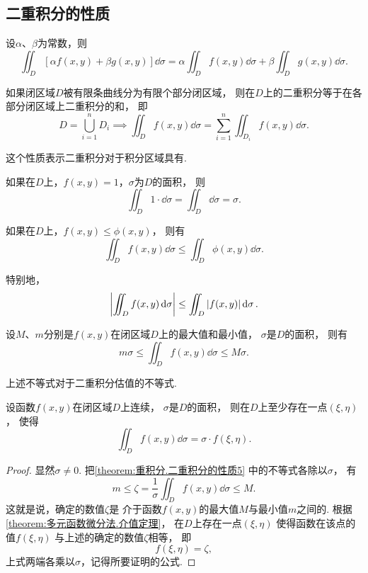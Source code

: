 \subsection{二重积分的性质}
\begin{property}\label{theorem:重积分.二重积分的性质1}
设\(\alpha\)、\(\beta\)为常数，则\[
\iint_D [\alpha f(x,y)+\beta g(x,y)] \dd{\sigma}
=\alpha \iint_D f(x,y) \dd{\sigma}
+\beta \iint_D g(x,y) \dd{\sigma}.
\]
\end{property}

\begin{property}\label{theorem:重积分.二重积分的性质2}
如果闭区域\(D\)被有限条曲线分为有限个部分闭区域，
则在\(D\)上的二重积分等于在各部分闭区域上二重积分的和，
即\[
	D = \bigcup_{i=1}^n D_i
	\implies
	\iint_D f(x,y) \dd{\sigma}
	= \sum_{i=1}^n \iint_{D_i} f(x,y) \dd{\sigma}.
\]
\end{property}
这个性质表示二重积分对于积分区域具有.

\begin{property}\label{theorem:重积分.二重积分的性质3}
如果在\(D\)上，\(f(x,y)=1\)，\(\sigma\)为\(D\)的面积，
则\[
	\iint_D 1\cdot\dd{\sigma}
	=\iint_D \dd{\sigma}
	=\sigma.
\]
\end{property}

\begin{property}\label{theorem:重积分.二重积分的性质4}
如果在\(D\)上，\(f(x,y) \leq \phi(x,y)\)，
则有\[
	\iint_D f(x,y) \dd{\sigma} \leq \iint_D \phi(x,y) \dd{\sigma}.
\]

特别地，\[
	\abs{\iint_D f(x,y) \dd{\sigma}} \leq \iint_D \abs{f(x,y)} \dd{\sigma}.
\]
\end{property}

\begin{property}\label{theorem:重积分.二重积分的性质5}
设\(M\)、\(m\)分别是\(f(x,y)\)在闭区域\(D\)上的最大值和最小值，
\(\sigma\)是\(D\)的面积，
则有\[
	m\sigma \leq \iint_D f(x,y) \dd{\sigma} \leq M\sigma.
\]
\end{property}
上述不等式对于二重积分估值的不等式.

\begin{property}[二重积分的中值定理]\label{theorem:重积分.二重积分的中值定理}
设函数\(f(x,y)\)在闭区域\(D\)上连续，
\(\sigma\)是\(D\)的面积，
则在\(D\)上至少存在一点\((\xi,\eta)\)，
使得\[
	\iint_D f(x,y) \dd{\sigma} = \sigma \cdot f(\xi,\eta).
\]
\begin{proof}
显然\(\sigma\neq0\).
把\cref{theorem:重积分.二重积分的性质5} 中的不等式各除以\(\sigma\)，
有\[
	m
	\leq
	\zeta = \frac{1}{\sigma} \iint_D f(x,y) \dd{\sigma}
	\leq
	M.
\]
这就是说，确定的数值\(\zeta\)是
介于函数\(f(x,y)\)的最大值\(M\)与最小值\(m\)之间的.
根据\cref{theorem:多元函数微分法.介值定理}，
在\(D\)上存在一点\((\xi,\eta)\)
使得函数在该点的值\(f(\xi,\eta)\)
与上述的确定的数值\(\zeta\)相等，
即\[
	f(\xi,\eta) = \zeta,
\]
上式两端各乘以\(\sigma\)，记得所要证明的公式.
\end{proof}
\end{property}

